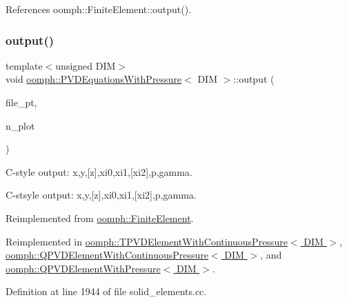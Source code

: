 References oomph\+::\+Finite\+Element\+::output().

\mbox{\label{classoomph_1_1PVDEquationsWithPressure_a27aee23c253bef90a7f389acd376fd27}} 
\subsubsection{\texorpdfstring{output()}{output()}\hspace{0.1cm}{\footnotesize\ttfamily [4/4]}}
{\footnotesize\ttfamily template$<$unsigned D\+IM$>$ \\
void \hyperlink{classoomph_1_1PVDEquationsWithPressure}{oomph\+::\+P\+V\+D\+Equations\+With\+Pressure}$<$ D\+IM $>$\+::output (\begin{DoxyParamCaption}\item[{F\+I\+LE $\ast$}]{file\+\_\+pt,  }\item[{const unsigned \&}]{n\+\_\+plot }\end{DoxyParamCaption})\hspace{0.3cm}{\ttfamily [virtual]}}



C-\/style output\+: x,y,\mbox{[}z\mbox{]},xi0,xi1,\mbox{[}xi2\mbox{]},p,gamma. 

C-\/stsyle output\+: x,y,\mbox{[}z\mbox{]},xi0,xi1,\mbox{[}xi2\mbox{]},p,gamma. 

Reimplemented from \hyperlink{classoomph_1_1FiniteElement_adfaee690bb0608f03320eeb9d110d48c}{oomph\+::\+Finite\+Element}.



Reimplemented in \hyperlink{classoomph_1_1TPVDElementWithContinuousPressure_a943ae7f4fcad3538108a207325160c92}{oomph\+::\+T\+P\+V\+D\+Element\+With\+Continuous\+Pressure$<$ D\+I\+M $>$}, \hyperlink{classoomph_1_1QPVDElementWithContinuousPressure_af9d764cc0daeb7151b37284bf2082162}{oomph\+::\+Q\+P\+V\+D\+Element\+With\+Continuous\+Pressure$<$ D\+I\+M $>$}, and \hyperlink{classoomph_1_1QPVDElementWithPressure_a129f52703db667b9b67a2aa7a6f7fb3e}{oomph\+::\+Q\+P\+V\+D\+Element\+With\+Pressure$<$ D\+I\+M $>$}.



Definition at line 1944 of file solid\+\_\+elements.\+cc.



